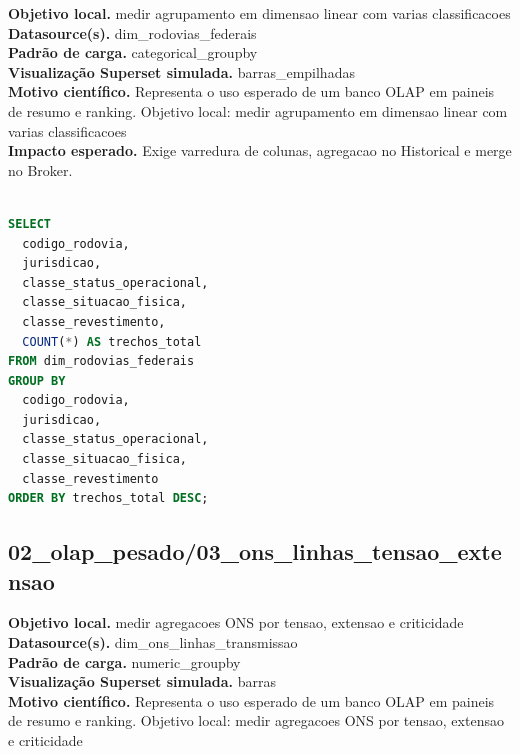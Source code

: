 \documentclass[11pt,a4paper]{article}
\begin{document}
\textbf{Objetivo local.} medir agrupamento em dimensao linear com varias classificacoes\\

\textbf{Datasource(s).} dim\_rodovias\_federais\\

\textbf{Padrão de carga.} categorical\_groupby\\

\textbf{Visualização Superset simulada.} barras\_empilhadas\\

\textbf{Motivo científico.} Representa o uso esperado de um banco OLAP em paineis de resumo e ranking. Objetivo local: medir agrupamento em dimensao linear com varias classificacoes\\

\textbf{Impacto esperado.} Exige varredura de colunas, agregacao no Historical e merge no Broker.

\begin{lstlisting}[language=SQL]

SELECT
  codigo_rodovia,
  jurisdicao,
  classe_status_operacional,
  classe_situacao_fisica,
  classe_revestimento,
  COUNT(*) AS trechos_total
FROM dim_rodovias_federais
GROUP BY
  codigo_rodovia,
  jurisdicao,
  classe_status_operacional,
  classe_situacao_fisica,
  classe_revestimento
ORDER BY trechos_total DESC;

\end{lstlisting}

\subsection{02\_olap\_pesado/03\_ons\_linhas\_tensao\_extensao}

\textbf{Objetivo local.} medir agregacoes ONS por tensao, extensao e criticidade\\

\textbf{Datasource(s).} dim\_ons\_linhas\_transmissao\\

\textbf{Padrão de carga.} numeric\_groupby\\

\textbf{Visualização Superset simulada.} barras\\

\textbf{Motivo científico.} Representa o uso esperado de um banco OLAP em paineis de resumo e ranking. Objetivo local: medir agregacoes ONS por tensao, extensao e criticidade\\
\end{document}
